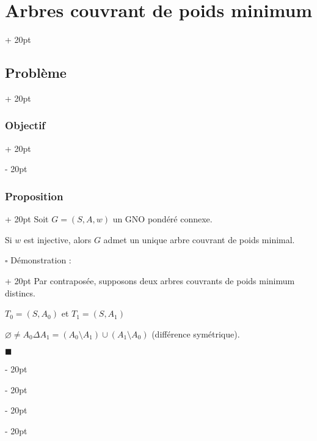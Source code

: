 \documentclass[a4paper, 12pt, twoside]{article}
\newcommand{\ind}[1][20pt]{\advance\leftskip + #1}
\newcommand{\deind}[1][20pt]{\advance\leftskip - #1}
\newenvironment{indt}[2][20pt]{#2 \par \ind[#1]}{\par \deind} %
\newenvironment{proof}[1][{Démonstration :}]{\begin{indt}{$\square$ #1}}{$\blacksquare$ \end{indt}}
\begin{document}
\begin{indt}{\section{Arbres couvrant de poids minimum}}
\begin{indt}{\subsection{Problème}}
\begin{indt}{\subsubsection{Objectif}}
\begin{center}
                \end{center}

                \begin{center}
                \end{center}
            \end{indt}

            \vspace{12pt}
            
            \begin{indt}{\subsubsection{Proposition}}
                Soit $G = (S, A, w)$ un GNO pondéré connexe.

                Si $w$ est injective, alors $G$ admet un unique arbre couvrant de poids minimal.

                \begin{proof}
                    Par contraposée, supposons deux arbres couvrants de poids minimum distincs.

                    $T_0 = (S, A_0)$ et $T_1 = (S, A_1)$

                    $\varnothing \neq A_0 \Delta A_1 = (A_0 \setminus A_1) \cup (A_1 \setminus A_0)$ (différence symétrique).


\end{proof}
\end{indt}
\end{indt}
\end{indt}
\end{document}
